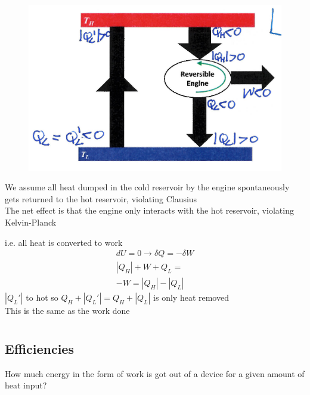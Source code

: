 \documentclass[a4paper, 11pt, normalem]{report}
\begin{document}
\begin{figure}
    \begin{center}
        \includegraphics[scale=0.35]{ClausKelvin.png}
    \end{center}
\end{figure}

We assume all heat dumped in the cold reservoir by the engine spontaneously gets returned to the hot reservoir, violating Clausius \\
The net effect is that the engine only interacts with the hot reservoir, violating Kelvin-Planck

i.e. all heat is converted to work
\begin{gather*}
    dU = 0 \to \delta Q = - \delta W \\
    |Q_{H}| + W + Q_{L} = \\
    -W = |Q_{H}| - |Q_{L}|
\end{gather*}
$|Q_{L}'|$ to hot so $Q_{H} + |Q_{L}'| = Q_{H} + |Q_{L}|$ is only heat removed\\
This is the same as the work done

\chapter{}
\section{Efficiencies}
How much energy in the form of work is got out of a device for a given amount of heat input?
\end{document}
